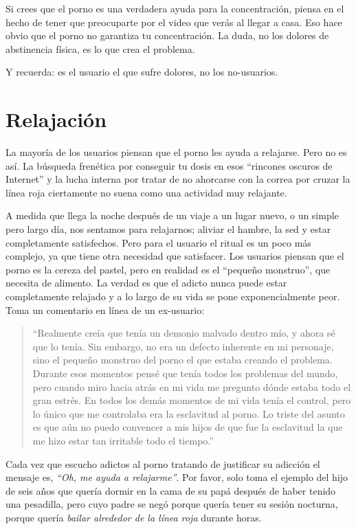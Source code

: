 \documentclass[
  spanish,
  openany]{book}
\begin{document}
Si crees que el porno es una verdadera ayuda para la concentración, piensa en el hecho de tener que preocuparte por el video que verás al llegar a casa. Eso hace obvio que el porno no garantiza tu concentración. La duda, no los dolores de abstinencia física, es lo que crea el problema.

Y recuerda: es el usuario el que sufre dolores, no los no-usuarios.

\hypertarget{relajaciuxf3n}{%
\section{Relajación}\label{relajaciuxf3n}}

La mayoría de los usuarios piensan que el porno les ayuda a relajarse. Pero no es así. La búsqueda frenética por conseguir tu dosis en esos ``rincones oscuros de Internet'' y la lucha interna por tratar de no ahorcarse con la correa por cruzar la línea roja ciertamente no suena como una actividad muy relajante.

A medida que llega la noche después de un viaje a un lugar nuevo, o un simple pero largo día, nos sentamos para relajarnos; aliviar el hambre, la sed y estar completamente satisfechos. Pero para el usuario el ritual es un poco más complejo, ya que tiene otra necesidad que satisfacer. Los usuarios piensan que el porno es la cereza del pastel, pero en realidad es el ``pequeño monstruo'', que necesita de alimento. La verdad es que el adicto nunca puede estar completamente relajado y a lo largo de su vida se pone exponencialmente peor. Toma un comentario en línea de un ex-usuario:

\begin{quote}
``Realmente creía que tenía un demonio malvado dentro mío, y ahora sé que lo tenía. Sin embargo, no era un defecto inherente en mi personaje, sino el pequeño monstruo del porno el que estaba creando el problema. Durante esos momentos pensé que tenía todos los problemas del mundo, pero cuando miro hacia atrás en mi vida me pregunto dónde estaba todo el gran estrés. En todos los demás momentos de mi vida tenía el control, pero lo único que me controlaba era la esclavitud al porno. Lo triste del asunto es que aún no puedo convencer a mis hijos de que fue la esclavitud la que me hizo estar tan irritable todo el tiempo.''
\end{quote}

Cada vez que escucho adictos al porno tratando de justificar su adicción el mensaje es, \emph{``Oh, me ayuda a relajarme''}. Por favor, solo toma el ejemplo del hijo de seis años que quería dormir en la cama de su papá después de haber tenido una pesadilla, pero cuyo padre se negó porque quería tener su sesión nocturna, porque quería \emph{bailar alrededor de la línea roja} durante horas.
\end{document}
